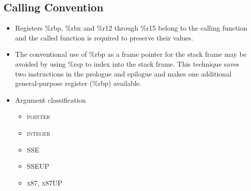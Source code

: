 \documentclass[a4paper,12pt]{article}
\begin{document}
\subsection{Calling Convention}
\begin{itemize}
\item Registers \%rbp, \%rbx and \%r12 through \%r15 belong to the calling function and the called function is required to preserve their values.
\item The conventional use of \%rbp as a frame pointer for the stack frame may be avoided by using \%rsp to index into the stack frame. This technique saves two instructions in the prologue and epilogue and makes one additional general-purpose register (\%rbp) available.
\item Argument classification
\begin{itemize}
\item \textsc{pointer}
\item \textsc{integer}
\item \textsc{SSE}
\item \textsc{SSEUP}
\item \textsc{x87, x87UP}
\end{itemize}
\end{itemize}
\newpage
{}
\tableofcontents
{}
\end{document}
